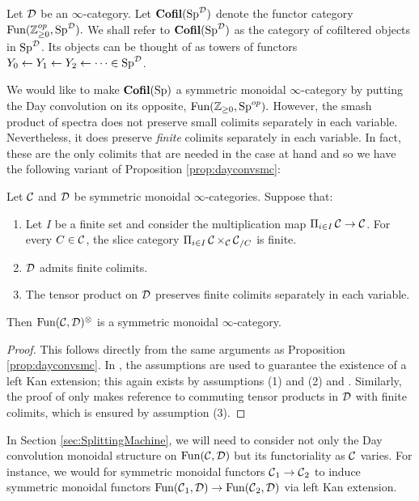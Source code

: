 \begin{dfn}Let $\operatorname{\mathcal{D}}$ be an $\infty$-category.  Let $\operatorname{\textbf{Cofil}}(\operatorname{\text{Sp}}^{\operatorname{\mathcal{D}}})$ denote the functor category $\operatorname{\text{Fun}}(\operatorname{\mathbb{Z}}_{\geq 0}^{op}, \operatorname{\text{Sp}}^{\operatorname{\mathcal{D}}}).$  We shall refer to $\operatorname{\textbf{Cofil}}(\operatorname{\text{Sp}}^{\operatorname{\mathcal{D}}})$ as the category of cofiltered objects in $\operatorname{\text{Sp}}^{\operatorname{\mathcal{D}}}$.  Its objects can be thought of as towers of functors $Y_0\leftarrow Y_1\leftarrow Y_2 \leftarrow \cdots \in \operatorname{\text{Sp}}^{\operatorname{\mathcal{D}}}$.
\end{dfn}

We would like to make $\operatorname{\textbf{Cofil}}(\operatorname{\text{Sp}})$ a symmetric monoidal $\infty$-category by putting the Day convolution on its opposite, $\operatorname{\text{Fun}}(\operatorname{\mathbb{Z}}_{\geq 0}, \operatorname{\text{Sp}}^{op}).$  However, the smash product of spectra does not preserve small colimits separately in each variable.  Nevertheless, it does preserve \emph{finite} colimits separately in each variable.  In fact, these are the only colimits that are needed in the case at hand and so we have the following variant of Proposition \ref{prop:dayconvsmc}:

\begin{var}\label{var:day}
Let $\operatorname{\mathcal{C}}$ and $\operatorname{\mathcal{D}}$ be symmetric monoidal $\infty$-categories.  Suppose that:
\begin{enumerate}
\item Let $I$ be a finite set and consider the multiplication map $\Pi_{i\in I} \operatorname{\mathcal{C}} \to \operatorname{\mathcal{C}}$.  For every $C\in \operatorname{\mathcal{C}}$, the slice category $\Pi_{i\in I}\operatorname{\mathcal{C}} \times_{\operatorname{\mathcal{C}}} \operatorname{\mathcal{C}}_{/C}$ is finite.  
\item $\operatorname{\mathcal{D}}$ admits finite colimits. 
\item The tensor product on $\operatorname{\mathcal{D}}$ preserves finite colimits separately in each variable.  
\end{enumerate}
Then $\operatorname{\text{Fun}}(\operatorname{\mathcal{C}}, \operatorname{\mathcal{D}})^{\otimes}$ is a symmetric monoidal $\infty$-category.  
\end{var}
\begin{proof}
This follows directly from the same arguments as Proposition \ref{prop:dayconvsmc}.  In \cite[Corollary 2.2.6.14]{HA}, the assumptions are used to guarantee the existence of a left Kan extension; this again exists by assumptions (1) and (2) and \cite[Lemma 4.3.2.13]{HTT}.  Similarly, the proof of \cite[Proposition 2.2.6.16]{HA} only makes reference to commuting tensor products in $\operatorname{\mathcal{D}}$ with finite colimits, which is ensured by assumption (3).  
\end{proof}


In Section \ref{sec:SplittingMachine}, we will need to consider not only the Day convolution monoidal structure on $\operatorname{\text{Fun}}(\operatorname{\mathcal{C}},\operatorname{\mathcal{D}})$ but its functoriality as $\operatorname{\mathcal{C}}$ varies.  For instance, we would for symmetric monoidal functors $\operatorname{\mathcal{C}}_1 \to \operatorname{\mathcal{C}}_2$ to induce symmetric monoidal functors $\operatorname{\text{Fun}}(\operatorname{\mathcal{C}}_1,\operatorname{\mathcal{D}}) \to \operatorname{\text{Fun}}(\operatorname{\mathcal{C}}_2,\operatorname{\mathcal{D}})$ via left Kan extension.  

